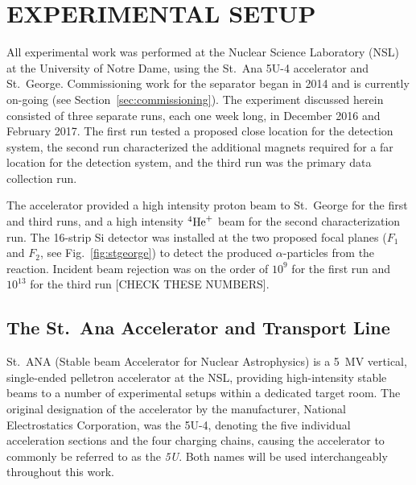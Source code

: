 \chapter{EXPERIMENTAL SETUP}
\label{ch:commissioning}


All experimental work was performed at the Nuclear Science Laboratory (NSL) at
the University of Notre Dame, using the St.\ Ana 5U-4 accelerator and
St.\ George. Commissioning work for the separator began in 2014 and is
currently on-going (see Section~\ref{sec:commissioning}). The experiment discussed
herein consisted of three separate runs, each one week long, in December 2016
and February 2017. The first run tested a proposed close location for the
detection system, the second run characterized the additional magnets required
for a far location for the detection system, and the third run was the primary
data collection run.

The accelerator provided a high intensity proton beam to St.\ George for the
first and third runs, and a high intensity ${}^{4}\textrm{He}^{+}$ beam for the
second characterization run. The 16-strip Si detector was installed at the two
proposed focal planes ($F_1$ and $F_2$, see Fig.~\ref{fig:stgeorge}) to detect
the produced $\alpha$-particles from the \alpa{} reaction. Incident beam
rejection was on the order of $10^9$ for the first run and $10^{13}$ for the
third run [CHECK THESE NUMBERS].


\section{The St.\ Ana Accelerator and Transport Line}
\label{sec:5U}

St.\ ANA (Stable beam Accelerator for Nuclear Astrophysics) is a 5~MV vertical,
single-ended pelletron accelerator at the NSL, providing high-intensity stable
beams to a number of experimental setups within a dedicated target room. The
original designation of the accelerator by the manufacturer, National
Electrostatics Corporation, was the 5U-4, denoting the five individual
acceleration sections and the four charging chains, causing the accelerator to
commonly be referred to as the \textit{5U}. Both names will be used
interchangeably throughout this work.

